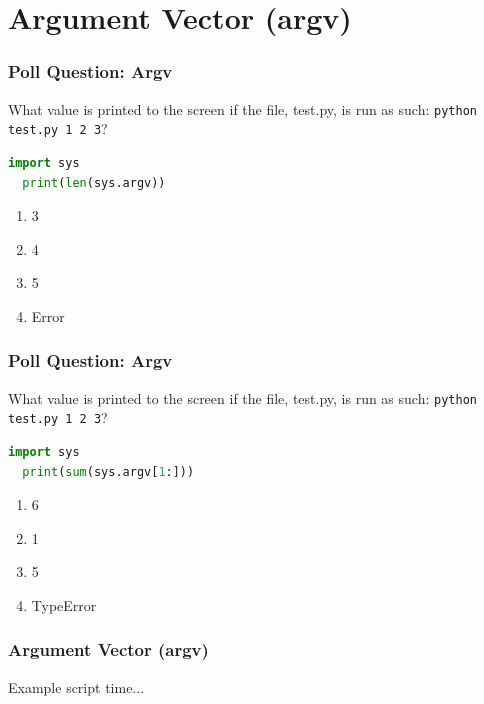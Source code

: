 \documentclass{beamer}
\begin{document}
\section{Argument Vector (argv)}

%
%
\begin{frame}[fragile]
  \frametitle{Poll Question: Argv}
  What value is printed to the screen if the file, test.py, is run as such: \lstinline|python test.py 1 2 3|?
  \begin{lstlisting}[language=Python, autogobble]
  import sys
  print(len(sys.argv))
  \end{lstlisting} 
  \vfill
  \begin{enumerate}[A]
    \item 3
    \item 4
    \item 5
    \item Error
  \end{enumerate}
\end{frame}

%
%
\begin{frame}[fragile]
  \frametitle{Poll Question: Argv}
  What value is printed to the screen if the file, test.py, is run as such: \lstinline|python test.py 1 2 3|?
  \begin{lstlisting}[language=Python, autogobble]
  import sys
  print(sum(sys.argv[1:]))
  \end{lstlisting} 
  \vfill
  \begin{enumerate}[A]
    \item 6
    \item 1
    \item 5
    \item TypeError
  \end{enumerate}
\end{frame}


%
%
\begin{frame}[fragile]
  \frametitle{Argument Vector (argv)}
  Example script time...
\end{frame}
\end{document}
